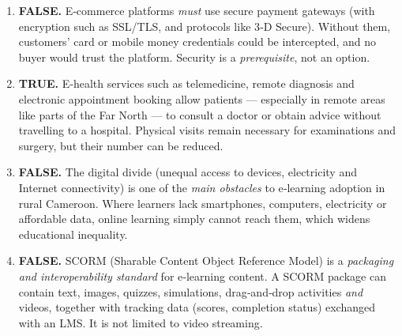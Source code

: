 \documentclass[11pt]{article}
\newcommand{\cle}[1]{{\popxbold\color{popdark}#1}}
\begin{document}
\begin{corrige}
\begin{enumerate}
\item \textbf{FALSE.} E‑commerce platforms \emph{must} use secure payment gateways (with encryption such as SSL/TLS, and protocols like 3‑D Secure). Without them, customers' card or mobile money credentials could be intercepted, and no buyer would trust the platform. Security is a \emph{prerequisite}, not an option.

\item \textbf{TRUE.} E‑health services such as telemedicine, remote diagnosis and electronic appointment booking allow patients — especially in remote areas like parts of the Far North — to consult a doctor or obtain advice without travelling to a hospital. Physical visits remain necessary for examinations and surgery, but their number can be reduced.

\item \textbf{FALSE.} The \cle{digital divide} (unequal access to devices, electricity and Internet connectivity) is one of the \emph{main obstacles} to e‑learning adoption in rural Cameroon. Where learners lack smartphones, computers, electricity or affordable data, online learning simply cannot reach them, which widens educational inequality.

\item \textbf{FALSE.} \cle{SCORM} (Sharable Content Object Reference Model) is a \emph{packaging and interoperability standard} for e‑learning content. A SCORM package can contain text, images, quizzes, simulations, drag‑and‑drop activities \emph{and} videos, together with tracking data (scores, completion status) exchanged with an LMS. It is not limited to video streaming.
\end{enumerate}
\end{corrige}
\end{document}
